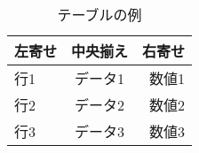 \documentclass{article}
\begin{document}
\begin{table}[ht]
\centering
\begin{tabular}{|l|c|r|}
\hline
左寄せ & 中央揃え & 右寄せ \\
\hline
行1 & データ1 & 数値1 \\
行2 & データ2 & 数値2 \\
行3 & データ3 & 数値3 \\
\hline
\end{tabular}
\caption{テーブルの例}
\label{table:example}
\end{table}
\end{document}
